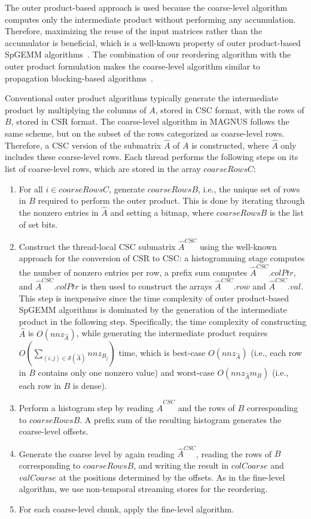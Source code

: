 The outer product-based approach is used because the coarse-level algorithm computes only the intermediate product without performing any accumulation.
Therefore, maximizing the reuse of the input matrices rather than the accumulator is beneficial, which is a well-known property of outer product-based SpGEMM algorithms~\cite{pbSpGEMM,gamma}.
The combination of our reordering algorithm with the outer product formulation makes the coarse-level algorithm similar to propagation blocking-based algorithms~\cite{pbSpGEMM}.

Conventional outer product algorithms typically generate the intermediate product by multiplying the columns of $A$, stored in CSC format, with the rows of $B$, stored in CSR format.
The coarse-level algorithm in MAGNUS follows the same scheme, but on the subset of the rows categorized as coarse-level rows.
Therefore, a CSC version of the submatrix $\hat{A}$ of $A$ is constructed, where $\hat{A}$ only includes these coarse-level rows.
Each thread performs the following steps on its list of coarse-level rows, which are stored in the array $coarseRowsC$:
\begin{enumerate}
    \item For all $i\in coarseRowsC$, generate $coarseRowsB$, i.e., the unique set of rows in $B$ required to perform the outer product.  This is done by iterating through the nonzero entries in $\hat{A}$ and setting a bitmap, where $coarseRowsB$ is the list of set bits.
    \item Construct the thread-local CSC submatrix $\hat{A}^{CSC}$ using the well-known approach for the conversion of CSR to CSC: a histogramming stage computes the number of nonzero entries per row, a prefix sum computes $\hat{A}^{CSC}.colPtr$, and $\hat{A}^{CSC}.colPtr$ is then used to construct the arrays $\hat{A}^{CSC}.row$ and $\hat{A}^{CSC}.val$.
    This step is inexpensive since the time complexity of outer product-based SpGEMM algorithms is dominated by the generation of the intermediate product in the following step. Specifically, the time complexity of constructing $\hat{A}$ is $O(nnz_{\hat{A}})$, while generating the intermediate product requires $O(\sum_{(i,j)\in \mathcal{S}(\hat{A})}nnz_{B_j})$ time, which is best-case $O(nnz_{\hat{A}})$ (i.e., each row in $B$ contains only one nonzero value) and worst-case $O(nnz_{\hat{A}} m_B)$ (i.e., each row in $B$ is dense).
    \item Perform a histogram step by reading $\hat{A}^{CSC}$ and the rows of $B$ corresponding to $coarseRowsB$.
    A prefix sum of the resulting histogram generates the coarse-level offsets.
    \item Generate the coarse level by again reading $\hat{A}^{CSC}$, reading the rows of $B$ corresponding to $coarseRowsB$, and writing the result in $colCoarse$ and $valCoarse$ at the positions determined by the offsets.
    As in the fine-level algorithm, we use non-temporal streaming stores for the reordering.
    \item For each coarse-level chunk, apply the fine-level algorithm.
\end{enumerate}

